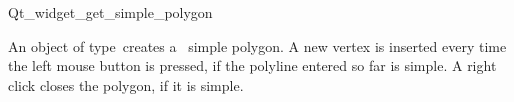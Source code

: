 
\begin{ccRefClass}{Qt_widget_get_simple_polygon}

\ccDefinition
An object of type\ccRefName\ creates a \cgal\ simple polygon.
A new vertex is inserted every time the left mouse button is pressed, if the 
polyline entered so far is simple. A right click closes the polygon, if
it is simple.


\ccInheritsFrom
{}
\ccGlue

\ccCreation
{}


\end{ccRefClass}








